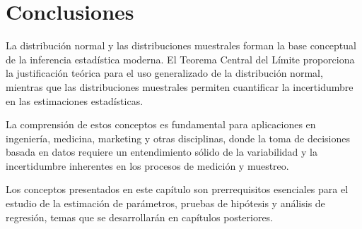 \section{Conclusiones}

La distribución normal y las distribuciones muestrales forman la base conceptual de la inferencia estadística moderna. El Teorema Central del Límite proporciona la justificación teórica para el uso generalizado de la distribución normal, mientras que las distribuciones muestrales permiten cuantificar la incertidumbre en las estimaciones estadísticas.

La comprensión de estos conceptos es fundamental para aplicaciones en ingeniería, medicina, marketing y otras disciplinas, donde la toma de decisiones basada en datos requiere un entendimiento sólido de la variabilidad y la incertidumbre inherentes en los procesos de medición y muestreo.

\begin{remark}
Los conceptos presentados en este capítulo son prerrequisitos esenciales para el estudio de la estimación de parámetros, pruebas de hipótesis y análisis de regresión, temas que se desarrollarán en capítulos posteriores.
\end{remark}
